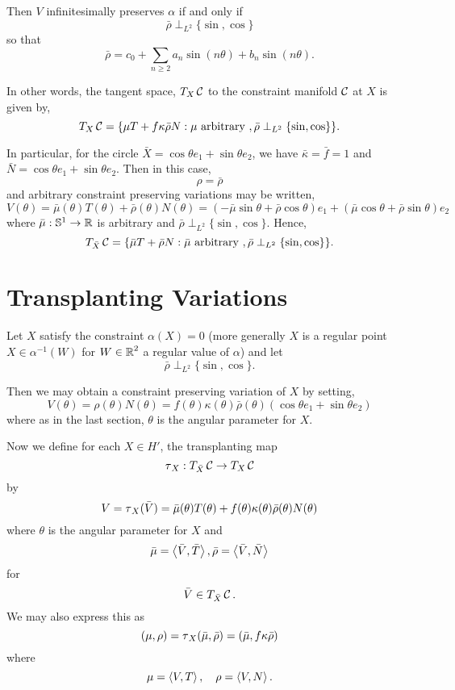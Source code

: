 \documentclass[12pt]{article}
\begin{document}
Then \(V\) infinitesimally preserves \(\alpha\) if and only if
\[
\bar{\rho} \perp_{L^2} \{\sin, \cos\}
\]
so that
\[
\bar{\rho} = c_0 + \sum_{n\geq 2} a_n \sin(n \theta) + b_n \sin(n \theta).
\]

In other words, the tangent space, \(T_X \operatorname{\mathcal{C}}\) to the constraint manifold \(\operatorname{\mathcal{C}}\) at \(X\) is given by,
\[
T_X \operatorname{\mathcal{C}} = \{\mu T + f\kappa\bar{\rho} N : \mu \text{ arbitrary }, \bar{\rho} \perp_{L^2} \{\sin, \cos\}\}.
\]

In particular, for the circle \(\bar{X} = \cos\theta e_1 + \sin \theta e_2\), we have \(\bar{\kappa} = \bar{f} = 1\) and \(\bar{N} = \cos\theta e_1 + \sin\theta e_2\). Then in this case,
\[
\rho = \bar{\rho}
\]
and arbitrary constraint preserving variations may be written,
\[
V(\theta) = \bar{\mu}(\theta) T(\theta) + \bar{\rho}(\theta) N(\theta) = (- \bar{\mu}\sin\theta + \bar{\rho} \cos\theta) e_1 + (\bar{\mu}\cos\theta + \bar{\rho}\sin\theta) e_2
\]
where \(\bar{\mu} : \operatorname{\mathbb{S}^1} \to \operatorname{\mathbb{R}}\) is arbitrary and \(\bar{\rho} \perp_{L^2} \{\sin, \cos\}\). Hence,
\[
T_{\bar{X}} \operatorname{\mathcal{C}} = \{\bar{\mu} T + \bar{\rho} N : \bar{\mu} \text{ arbitrary }, \bar{\rho} \perp_{L^2} \{\sin, \cos\}\}.
\]

\section{Transplanting Variations}

Let \(X\) satisfy the constraint \(\alpha(X) = 0\) (more generally \(X\) is a regular point \(X \in \alpha^{-1} (W)\) for \(W \in \operatorname{\mathbb{R}}^2\) a regular value of \(\alpha\)) and let
\[
\bar{\rho} \perp_{L^2} \{\sin, \cos\}.
\]

Then we may obtain a constraint preserving variation of \(X\) by setting,
\[
V(\theta) = \rho(\theta) N(\theta) = f(\theta) \kappa(\theta) \bar{\rho}(\theta) (\cos\theta e_1 + \sin\theta e_2)
\]
where as in the last section, \(\theta\) is the angular parameter for \(X\).

Now we define for each \(X \in H'\), the transplanting map
\[
\operatorname{\tau}_X : T_{\bar{X}} \operatorname{\mathcal{C}} \to T_X \operatorname{\mathcal{C}}
\]
by
\[
V = \operatorname{\tau}_X(\bar{V}) = \bar{\mu}(\theta) T(\theta) + f(\theta)\kappa(\theta)\bar{\rho}(\theta) N(\theta)
\]
where \(\theta\) is the angular parameter for \(X\) and
\[
\bar{\mu} = \left\langle{\bar{V}},{\bar{T}}\right\rangle, \bar{\rho} = \left\langle{\bar{V}},{\bar{N}}\right\rangle
\]
for
\[
\bar{V} \in T_{\bar{X}} \operatorname{\mathcal{C}}.
\]
We may also express this as
\[
(\mu, \rho) = \operatorname{\tau}_X(\bar{\mu}, \bar{\rho}) = (\bar{\mu}, f\kappa\bar{\rho})
\]
where
\[
\mu = \left\langle{V},{T}\right\rangle, \quad \rho = \left\langle{V},{N}\right\rangle.
\]
\end{document}
